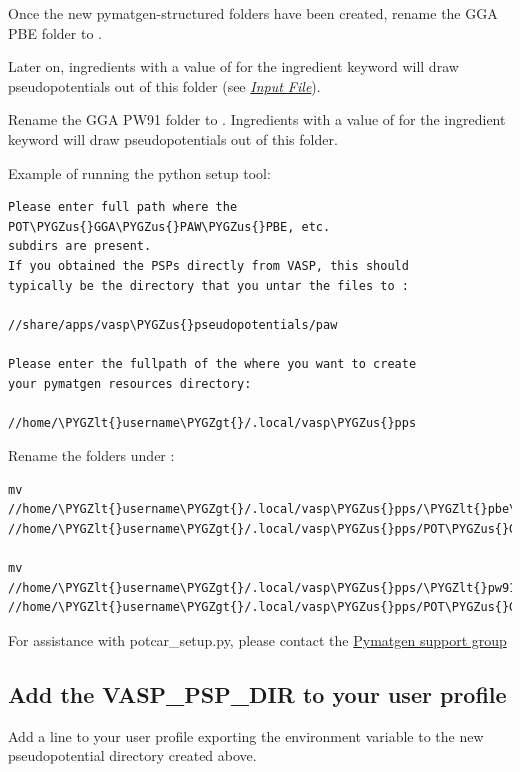 \documentclass[letterpaper,10pt,english]{sphinxmanual}
\def\PYGZus{\char`\_}
\def\PYGZlt{\char`\<}
\def\PYGZgt{\char`\>}
\begin{document}
Once the new pymatgen-structured folders have been created, rename the GGA PBE folder to .

Later on, ingredients with a value of  for the ingredient keyword  will draw pseudopotentials out of this folder (see {\hyperref[3_0_inputfile::doc]{\emph{Input File}}}).

Rename the GGA PW91 folder to . Ingredients with a value of  for the ingredient keyword  will draw pseudopotentials out of this folder.

Example of running the python setup tool:

\begin{Verbatim}[commandchars=\\\{\}]
Please enter full path where the POT\PYGZus{}GGA\PYGZus{}PAW\PYGZus{}PBE, etc.
subdirs are present.
If you obtained the PSPs directly from VASP, this should
typically be the directory that you untar the files to :

//share/apps/vasp\PYGZus{}pseudopotentials/paw

Please enter the fullpath of the where you want to create
your pymatgen resources directory:

//home/\PYGZlt{}username\PYGZgt{}/.local/vasp\PYGZus{}pps
\end{Verbatim}

Rename the folders under :

\begin{Verbatim}[commandchars=\\\{\}]
mv //home/\PYGZlt{}username\PYGZgt{}/.local/vasp\PYGZus{}pps/\PYGZlt{}pbe\PYGZus{}name\PYGZgt{} //home/\PYGZlt{}username\PYGZgt{}/.local/vasp\PYGZus{}pps/POT\PYGZus{}GGA\PYGZus{}PAW\PYGZus{}PBE

mv //home/\PYGZlt{}username\PYGZgt{}/.local/vasp\PYGZus{}pps/\PYGZlt{}pw91\PYGZus{}name\PYGZgt{} //home/\PYGZlt{}username\PYGZgt{}/.local/vasp\PYGZus{}pps/POT\PYGZus{}GGA\PYGZus{}PAW\PYGZus{}PW91
\end{Verbatim}

For assistance with potcar\_setup.py, please contact the
\href{https://groups.google.com/forum/\#!forum/pymatgen}{Pymatgen support group}


\subsection{Add the VASP\_PSP\_DIR to your user profile}
\label{1_0_installation:add-the-vasp-psp-dir-to-your-user-profile}
Add a line to your user profile exporting the environment variable  to the new pseudopotential directory created above.
\end{document}

